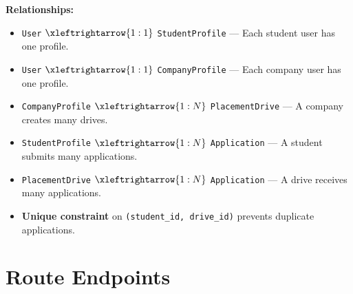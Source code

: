 \documentclass[12pt,a4paper]{article}
\begin{document}
\begin{center}
\end{center}

\textbf{Relationships:}
\begin{itemize}[leftmargin=*]
    \item \texttt{User} $\xleftrightarrow{1:1}$ \texttt{StudentProfile} --- Each student user has one profile.
    \item \texttt{User} $\xleftrightarrow{1:1}$ \texttt{CompanyProfile} --- Each company user has one profile.
    \item \texttt{CompanyProfile} $\xleftrightarrow{1:N}$ \texttt{PlacementDrive} --- A company creates many drives.
    \item \texttt{StudentProfile} $\xleftrightarrow{1:N}$ \texttt{Application} --- A student submits many applications.
    \item \texttt{PlacementDrive} $\xleftrightarrow{1:N}$ \texttt{Application} --- A drive receives many applications.
    \item \textbf{Unique constraint} on \texttt{(student\_id, drive\_id)} prevents duplicate applications.
\end{itemize}

\section{Route Endpoints}
\end{document}
